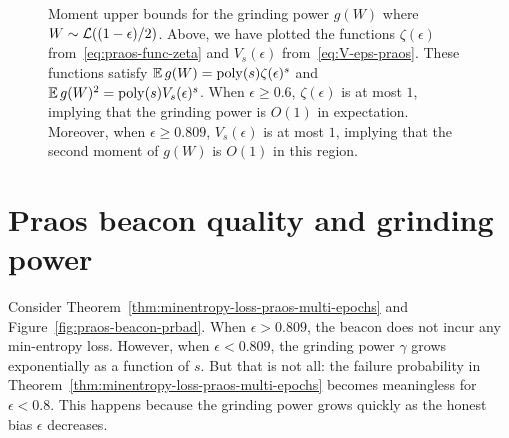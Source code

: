   \begin{figure}[!htb]
    \centering
    \caption[GP moment bounds for Praos]{
      Moment upper bounds for the grinding power $g(W)$ 
      where $W \sim \mathcal{L}((1-\epsilon)/2)$.
      Above, we have plotted the functions $\zeta(\epsilon)$ 
      from~\eqref{eq:praos-func-zeta}
      and $V_s(\epsilon)$ from~\eqref{eq:V-eps-praos}. 
      These functions satisfy 
      $\operatorname{\mathbb{E}} g(W) = \mathrm{poly}(s) \zeta(\epsilon)^s$ and $\operatorname{\mathbb{E}} g(W)^2 = \mathrm{poly}(s) V_s(\epsilon)^s$. 
      When $\epsilon \geq 0.6$, $\zeta(\epsilon)$ is at most $1$, 
      implying that the grinding power is $O(1)$ in expectation.
      Moreover, when $\epsilon \geq 0.809$, $V_s(\epsilon)$ is at most $1$, 
      implying that the second moment of $g(W)$ is $O(1)$ in this region. 
    }
    \label{fig:praos-gp-moments-exact}
  \end{figure}


\section{Praos beacon quality and grinding power}
Consider Theorem~\ref{thm:minentropy-loss-praos-multi-epochs} 
and Figure~\ref{fig:praos-beacon-prbad}.
When $\epsilon > 0.809$, 
the beacon does not incur any min-entropy loss. 
However, when $\epsilon < 0.809$, 
the grinding power $\gamma$ grows exponentially as a function of $s$. 
But that is not all: 
the failure probability in Theorem~\ref{thm:minentropy-loss-praos-multi-epochs} 
becomes meaningless for $\epsilon < 0.8$. 
This happens because the grinding power grows quickly 
as the honest bias $\epsilon$ decreases.

